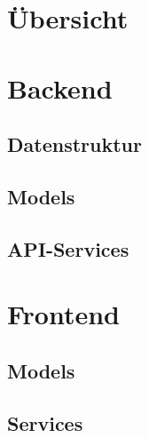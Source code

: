 \section{Übersicht}
\lipsum[10]

\section{Backend}

\subsection{Datenstruktur}
\subsection{Models}
\subsection{API-Services}

\section{Frontend}

\subsection{Models}
\subsection{Services}
